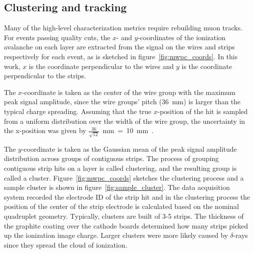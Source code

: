 \subsection{Clustering and tracking}

Many of the high-level characterization metrics require rebuilding muon tracks. For events passing quality cuts, the $x$- and $y$-coordinates of the ionization avalanche on each layer are extracted from the signal on the wires and strips respectively for each event, as is sketched in figure~\ref{fig:mwpc_coords}. In this work, $x$ is the coordinate perpendicular to the wires and $y$ is the coordinate perpendicular to the strips.

The $x$-coordinate is taken as the center of the wire group with the maximum peak signal amplitude, since the wire groups' pitch (\SI{36}{\milli\meter}) is larger than the typical charge spreading. Assuming that the true $x$-position of the hit is sampled from a uniform distribution over the width of the wire group, the uncertainty in the x-position was given by $\frac{36}{\sqrt{12}}$~mm~=~10~mm~\cite{Sauli:117989}.

The $y$-coordinate is taken as the Gaussian mean of the peak signal amplitude distribution across groups of contiguous strips. The process of grouping contiguous strip hits on a layer is called clustering, and the resulting group is called a cluster. Figure~\ref{fig:mwpc_coords} sketches the clustering process and a sample cluster is shown in figure~\ref{fig:sample_cluster}. The data acquisition system recorded the electrode ID of the strip hit and in the clustering process the position of the center of the strip electrode is calculated based on the nominal quadruplet geometry. Typically, clusters are built of 3-5 strips. The thickness of the graphite coating over the cathode boards determined how many strips picked up the ionization image charge. Larger clusters were more likely caused by $\delta$-rays since they spread the cloud of ionization. 


